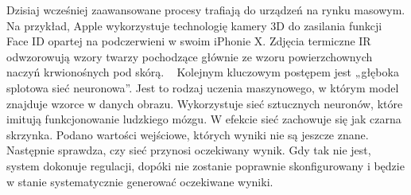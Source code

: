 Dzisiaj wcześniej zaawansowane procesy trafiają do urządzeń na rynku masowym. Na przykład, Apple wykorzystuje technologię kamery 3D do zasilania funkcji Face ID opartej na podczerwieni w swoim iPhonie X. Zdjęcia termiczne IR odwzorowują wzory twarzy pochodzące głównie ze wzoru powierzchownych naczyń krwionośnych pod skórą.
 
Kolejnym kluczowym postępem jest „głęboka splotowa sieć neuronowa”. Jest to rodzaj uczenia maszynowego, w którym model znajduje wzorce w danych obrazu. Wykorzystuje sieć sztucznych neuronów, które imitują funkcjonowanie ludzkiego mózgu. W efekcie sieć zachowuje się jak czarna skrzynka. Podano wartości wejściowe, których wyniki nie są jeszcze znane. Następnie sprawdza, czy sieć przynosi oczekiwany wynik. Gdy tak nie jest, system dokonuje regulacji, dopóki nie zostanie poprawnie skonfigurowany i będzie w stanie systematycznie generować oczekiwane wyniki.